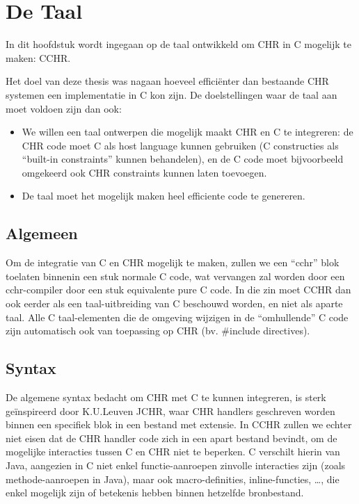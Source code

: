 \chapter{De Taal}

In dit hoofdstuk wordt ingegaan op de taal ontwikkeld om CHR in C mogelijk te maken: CCHR.

Het doel van deze thesis was nagaan hoeveel effici\"enter dan bestaande CHR systemen een implementatie
in C kon zijn. De doelstellingen waar de taal aan moet voldoen zijn dan ook: \begin{itemize}
  \item We willen een taal ontwerpen die mogelijk maakt CHR en C te integreren: de CHR code moet C
        als host language kunnen gebruiken (C constructies als ``built-in constraints'' kunnen
	behandelen), en de C code moet bijvoorbeeld omgekeerd ook CHR constraints kunnen laten toevoegen.
  \item De taal moet het mogelijk maken heel efficiente code te genereren.
\end{itemize}

\section{Algemeen}

Om de integratie van C en CHR mogelijk te maken, zullen we een ``cchr'' blok toelaten binnenin een stuk normale C code, wat vervangen zal worden door een cchr-compiler door een stuk equivalente pure C code. In die zin moet CCHR dan ook eerder als een taal-uitbreiding van C beschouwd worden, en niet als aparte taal. Alle C taal-elementen die de omgeving wijzigen in de ``omhullende'' C code zijn automatisch ook van toepassing op CHR (bv. \#include directives). 

\section{Syntax}

De algemene syntax bedacht om CHR met C te kunnen integreren, is sterk ge\"inspireerd door K.U.Leuven JCHR, waar CHR handlers geschreven worden binnen een specifiek blok in een bestand met  extensie. In CCHR zullen we echter niet eisen dat de CHR handler code zich in een apart bestand bevindt, om de mogelijke interacties tussen C en CHR niet te beperken. C verschilt hierin van Java, aangezien in C niet enkel functie-aanroepen zinvolle interacties zijn (zoals methode-aanroepen in Java), maar ook macro-definities, inline-functies, \ldots, die enkel mogelijk zijn of betekenis hebben binnen hetzelfde bronbestand.

